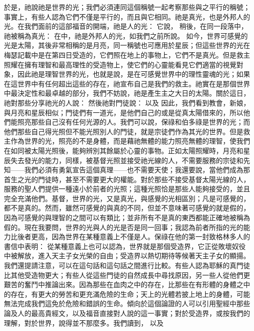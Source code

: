 於是，祂說祂是世界的光；我們必須連同這個稱號一起考察那些與之平行的稱號；事實上，有些人認為它們不僅是平行的，而且與它相同。祂是真光，也是外邦人的光。在我們面前的這部福音的開端，祂是人的光：  它說， 稍後，在同一段落中，祂被稱為真光：  在中，祂是外邦人的光，如我們之前所說。 如今，世界可感覺的光是太陽，其後非常相稱的是月亮，同一稱號也可應用於星辰；但這些世界的光在梅瑟記載中是在第四日受造的，它們照在地上的事物上，它們不是真光。但是救主照耀在擁有理智和最高理性的受造物上，使它們的心靈能看見它們適當的視覺對象，因此祂是理智世界的光，也就是說，是在可感覺世界中的理性靈魂的光；如果在這世界中有任何超出這些的存在，祂宣布自己是我們的救主。祂實在是那個世界中最決定性和最卓越的部分，我們不妨說，祂是產生主之大日的太陽。關於這日，祂對那些分享祂光的人說： 然後祂對門徒說： 以及  因此，我們看到教會，新娘，與月亮和星辰相似；門徒們有一道光，是他們自己的或是從真太陽借來的，所以他們能照亮那些自己沒有任何光源的人。我們可以說，保祿和伯多祿是世界的光；而他們那些自己得光照但不能光照別人的門徒，就是宗徒們作為其光的世界。但是救主作為世界的光，照亮的不是身體，而是藉祂無體的能力照亮無體的理智，使我們在如同被太陽光照後，能夠辨別其餘屬於心靈的事物。正如太陽照耀時，月亮和星辰失去發光的能力，同樣，被基督光照並接受祂光線的人，不需要服務的宗徒和先知——我們必須有勇氣宣告這個真理——也不需要天使；我還要說，當他們成為那首生之光的門徒時，甚至不需要更大的權能。對於那些不接受基督太陽光線的人，服務的聖人們提供一種遠小於前者的光照；這種光照恰是那些人能夠接受的，並且完全充滿他們。基督，世界的光，又是真光，與感覺的光相區別；凡是可感覺的，都不是真的。然而，雖然可感覺的與真的不同，但並不意味著可感覺的就是假的，因為可感覺的與理智的之間可以有類比；並非所有不是真的東西都能正確地被稱為假的。現在我要問，世界的光與人的光是否是同一回事；我認為前者所指的光的能力比後者更高，因為世界在某種意義上不僅是人。保祿在他的第一封致格林多人的書信中表明：  從某種意義上也可以認為，世界就是那個受造界，它正從敗壞奴役中被解放，進入天主子女光榮的自由；受造界以熱切期待等候著天主子女的顯揚。我們還提請注意，可以在這句話和這句話之間進行比較。有些人認為耶穌的真門徒比其他受造物更大；有些人從這些門徒的自然成長中尋找原因，另一些人從他們更艱苦的奮鬥中推論出來。因為那些在血肉之中的存在，比那些在有形體的身體之中的存在，有更大的勞苦和更充滿危險的生命；天上的光體若披上地上的身體，可能無法完成我們這免於危險和錯誤的生命。傾向於這個論證的人可以引用聖經中那些論及人的最高貴經文，以及福音直接對人說的這一事實；對於受造界，或按我們的理解，對於世界，說得並不那麼多。我們讀到，  以及  